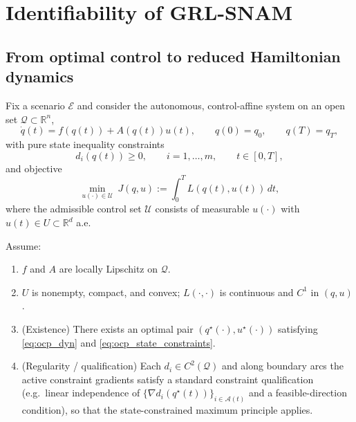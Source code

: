 \newpage
\appendix

\section{Identifiability of GRL-SNAM}
\label{app:proof:and:lemma}
\subsection{From optimal control to reduced Hamiltonian dynamics }
\label{app:ocp_to_ham}
\begin{lemma}
\label{thm:forward_state_constrained_pmp_reduced_ham}
Fix a scenario $\mathcal{E}$ and consider the autonomous, control-affine system on an open set
$\mathcal{Q}\subset\mathbb{R}^n$,
\begin{equation}
\dot q(t)=f(q(t)) + A(q(t))u(t),\qquad q(0)=q_0,\qquad q(T)=q_T,
\label{eq:ocp_dyn}
\end{equation}
with pure state inequality constraints
\begin{equation}
d_i(q(t))\ge 0,\qquad i=1,\dots,m,\qquad t\in[0,T],
\label{eq:ocp_state_constraints}
\end{equation}
and objective
\begin{equation}
\min_{u(\cdot)\in\mathcal{U}} \ J(q, u)
:=\int_0^T L(q(t),u(t))\,dt,
\label{eq:ocp_cost}
\end{equation}
where the admissible control set $\mathcal{U}$ consists of measurable $u(\cdot)$ with
$u(t)\in U\subset\mathbb{R}^d$ a.e.

Assume:
\begin{enumerate}
\item $f$ and $A$ are locally Lipschitz on $\mathcal{Q}$.
\item $U$ is nonempty, compact, and convex; $L(\cdot,\cdot)$ is continuous and $C^1$ in $(q,u)$.
\item (Existence) There exists an optimal pair $(q^\star(\cdot),u^\star(\cdot))$ satisfying
\cref{eq:ocp_dyn} and \cref{eq:ocp_state_constraints}.
\item (Regularity / qualification) Each $d_i\in C^2(\mathcal{Q})$ and along boundary arcs the active constraint
gradients satisfy a standard constraint qualification (e.g.\ linear independence of
$\{\nabla d_i(q^\star(t))\}_{i\in\mathcal{A}(t)}$ and a feasible-direction condition), so that the
state-constrained maximum principle applies.
\end{enumerate}


\end{lemma}
